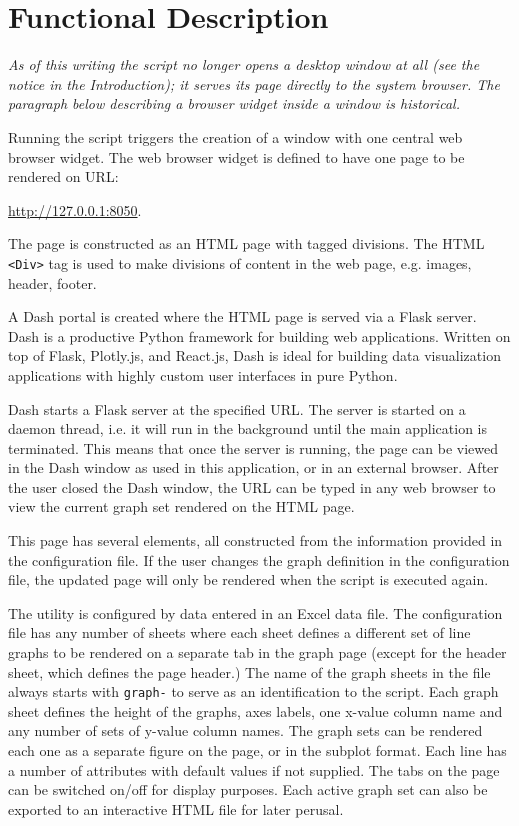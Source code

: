 
\chapter{Functional Description}

\textit{As of this writing the script no longer opens a desktop window at
all (see the notice in the Introduction); it serves its page directly to
the system browser. The paragraph below describing a browser widget inside
a window is historical.}

Running the script triggers the creation of a window with one central web browser widget.
The web browser widget is defined to have one page to be rendered on \ac{URL}:

 \url{http://127.0.0.1:8050}.

The page is constructed as an \ac{HTML} page with tagged divisions.
The \ac{HTML} \texttt{<Div>} tag is used to make divisions of content in the web page, e.g. images, header, footer.

A Dash portal is created where the \ac{HTML} page is served via a Flask server.
Dash is a productive Python framework for building web applications.
Written on top of Flask, Plotly.js, and React.js, Dash is ideal for building data visualization applications with highly custom user interfaces in pure Python.

Dash starts a Flask server at the specified \ac{URL}.
The server is started on a daemon thread, i.e. it will run in the background until the main application is terminated.
This means that once the server is running, the page can be viewed in the Dash window as used in this application, or in an external browser.
After the user closed the Dash window, the \ac{URL} can be typed in any web browser to view the current graph set rendered on the \ac{HTML} page.

This page has several elements, all constructed from the information provided in the configuration file. If the user changes the graph definition in the configuration file, the updated page will only be rendered when the script is executed again.

The utility is configured by data entered in an Excel data file. 
The configuration file has any number of sheets where each sheet defines
a different set of line graphs to be rendered on a separate tab in the graph page
(except for the header sheet, which defines the page header.)
The name of the graph sheets in the file always starts with \texttt{graph-} to serve as an identification to the script.
Each graph sheet defines the height of the graphs, axes labels,
one x-value column name and any number of sets of y-value column names.
The graph sets can be rendered each one as a separate figure on the page, or in the subplot format.
Each line has a number of attributes with default values if not supplied.
The tabs on the page can be switched on/off for display purposes.
Each active graph set can also be exported to an interactive \ac{HTML} file for later perusal.

